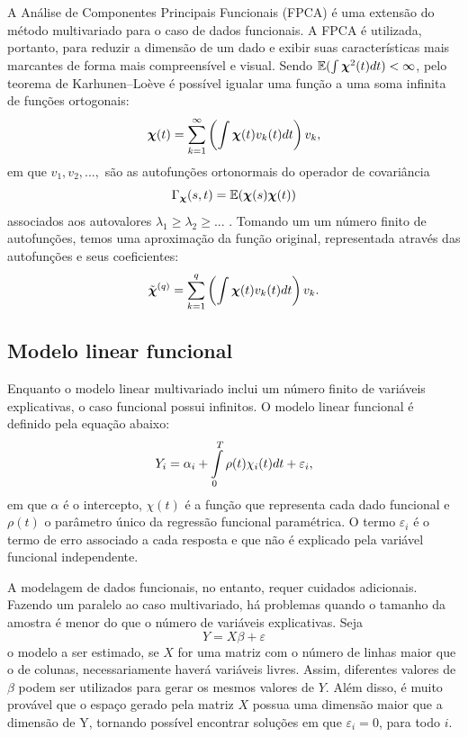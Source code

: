 \documentclass[
	12pt,				%
	openright,			%
	oneside,			%
	a4paper,			%
	english,			%
	brazil				%
	]{dissertacao-ufrgs-abntex2}
\begin{document}
A Análise de Componentes Principais Funcionais (FPCA) é uma extensão do método multivariado para o caso de dados funcionais. 
A FPCA é utilizada, portanto, para reduzir a dimensão de um dado e exibir suas
características mais marcantes de forma mais compreensível e visual. Sendo
$\mathbb{E}(\int\boldsymbol{\chi}^{2}(t)dt)<\infty$, pelo teorema de Karhunen–Loève é possível igualar uma função a uma soma infinita de funções ortogonais:
\begin{equation}
\boldsymbol{\chi}(t)=\sum_{k=1}^{\text{\ensuremath{\infty}}}\left(\int\boldsymbol{\chi}(t)v_{k}(t)dt\right)v_{k},
\end{equation}
em que $v_{1},v_{2},...,$ são as autofunções ortonormais do operador de covariância
\begin{equation}
\Gamma_{\boldsymbol{\chi}}(s,t)=\mathbb{E}(\boldsymbol{\chi}(s)\boldsymbol{\chi}(t))
\end{equation}
associados aos autovalores $\lambda_{1}\geq\lambda_{2}\geq...$ .
Tomando um um número finito de autofunções, temos uma aproximação da função original, representada através das autofunções e seus coeficientes:
\begin{equation}
\tilde{\boldsymbol{\chi}}^{(q)}=\sum_{k=1}^{\text{\ensuremath{q}}}\left(\int\boldsymbol{\chi}(t)v_{k}(t)dt\right)v_{k}.
\end{equation}


\subsection{Modelo linear funcional}

Enquanto o modelo linear multivariado inclui um número finito de variáveis explicativas, o caso funcional possui infinitos. O modelo linear funcional é definido pela equação abaixo:
\begin{equation}
Y_{i}=\alpha_{i}+\intop_{0}^{T}\rho(t)\chi_{i}(t)dt+\varepsilon_{i},\label{eq:modelofuncionallinear}
\end{equation}
em que $\alpha$ é o intercepto, $\chi(t)$ é a função que representa
cada dado funcional e $\rho(t)$ o parâmetro único da regressão funcional
paramétrica. O termo $\varepsilon_{i}$ é o termo de erro associado
a cada resposta e que não é explicado pela variável funcional
independente.

A modelagem de dados funcionais, no entanto, requer cuidados adicionais. Fazendo um paralelo ao caso multivariado, há problemas quando
o tamanho da amostra é menor do que o número de variáveis explicativas.
Seja
\begin{equation}
Y=X\beta+\varepsilon
\end{equation}
o modelo a ser estimado, se $X$ for uma matriz com o número de linhas
maior que o de colunas, necessariamente haverá variáveis livres. Assim,
diferentes valores de $\beta$ podem ser utilizados para gerar os
mesmos valores de $Y$. Além disso, é muito provável que o espaço
gerado pela matriz $X$ possua uma dimensão maior que a dimensão de
Y, tornando possível encontrar soluções em que $\varepsilon_{i}=0$,
para todo $i$. 
\end{document}
